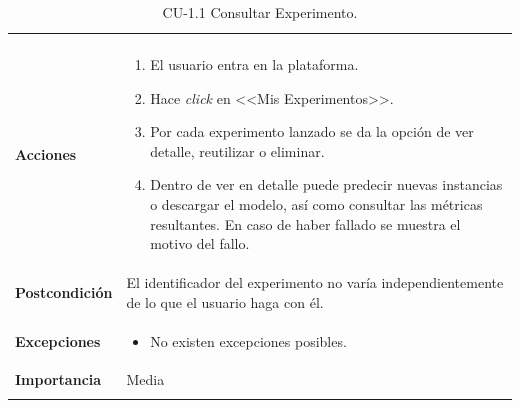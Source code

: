 \begin{longtable}[H]{@{}ll@{}}
\begin{minipage}[t]{0.71\columnwidth}
\begin{itemize}
\end{itemize}\strut
\end{minipage}\tabularnewline
\begin{minipage}[t]{0.23\columnwidth}\raggedright\strut
\textbf{Acciones}\strut
\end{minipage} & \begin{minipage}[t]{0.71\columnwidth}\raggedright\strut
\begin{enumerate}
\def\labelenumi{\arabic{enumi}.}
\tightlist
\item El usuario entra en la plataforma.
\item Hace \textit{click} en <<Mis Experimentos>>.
\item Por cada experimento lanzado se da la opción de ver detalle, reutilizar o eliminar.
\item Dentro de ver en detalle puede predecir nuevas instancias o descargar el modelo, así como consultar las métricas resultantes. En caso de haber fallado se muestra el motivo del fallo.
\end{enumerate}\strut
\end{minipage}\tabularnewline
\begin{minipage}[t]{0.23\columnwidth}\raggedright\strut
\textbf{Postcondición}\strut
\end{minipage} & \begin{minipage}[t]{0.71\columnwidth}\raggedright\strut
El identificador del experimento no varía independientemente de lo que el usuario haga con él.\strut
\end{minipage}\tabularnewline
\begin{minipage}[t]{0.23\columnwidth}\raggedright\strut
\textbf{Excepciones}\strut
\end{minipage} & \begin{minipage}[t]{0.71\columnwidth}\raggedright\strut
\begin{itemize}
\tightlist
\item No existen excepciones posibles.
\end{itemize}\strut
\end{minipage}\tabularnewline
\begin{minipage}[t]{0.23\columnwidth}\raggedright\strut
\textbf{Importancia}\strut
\end{minipage} & \begin{minipage}[t]{0.71\columnwidth}\raggedright\strut
Media\strut
\end{minipage}\tabularnewline
\bottomrule
\caption{CU-1.1 Consultar Experimento.}
\end{longtable}

